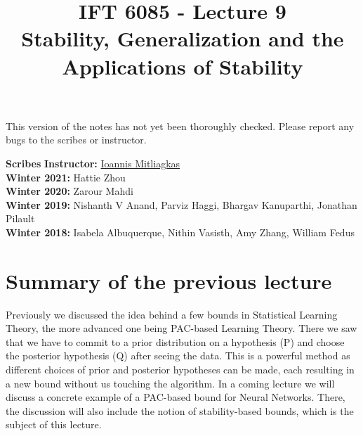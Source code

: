 \documentclass{article}
\title{IFT 6085 - Lecture 9 \\ Stability, Generalization and the Applications of Stability}
\date{}
\begin{document}
 

\maketitle

\vspace{-0.5in}
\begin{center}
This version of the notes has not yet been thoroughly checked.
Please report any bugs to the scribes or instructor.
\end{center}
\vspace{0.2in}

\textbf{Scribes}\hfill
\textbf{Instructor:}  {\href{https://mitliagkas.github.io/}{Ioannis Mitliagkas}}\\
\textbf{Winter 2021:} Hattie Zhou\\
\textbf{Winter 2020:} Zarour Mahdi\\
\textbf{Winter 2019:} Nishanth V Anand, Parviz Haggi,
Bhargav Kanuparthi, Jonathan Pilault\\
\textbf{Winter 2018:} Isabela Albuquerque, Nithin Vasisth, Amy Zhang, William Fedus



\newcommand{\infgc}{\inf_{g \in \mathcal{C}}}
\newcommand{\supgc}{\sup_{g \in \mathcal{C}}}

\newcommand{\Prob}{\mathbb{P}}
\newcommand{\E}{\mathbb{E}}
\newcommand{\reals}{\mathbb{R}}

\section{Summary of the previous lecture}
Previously we discussed the idea behind a few bounds in Statistical Learning Theory, the more advanced one being PAC-based Learning Theory. There we saw that we have to commit to a prior distribution on a hypothesis (P) and choose the posterior hypothesis (Q) after seeing the data. This is a powerful method as different choices of prior and posterior hypotheses can be made, each resulting in a new bound without us touching the algorithm. 
In a coming lecture we will discuss a concrete example of a PAC-based bound for Neural Networks. There, the discussion will also include the notion of stability-based bounds, which is the subject of this lecture.\\
\end{document}
